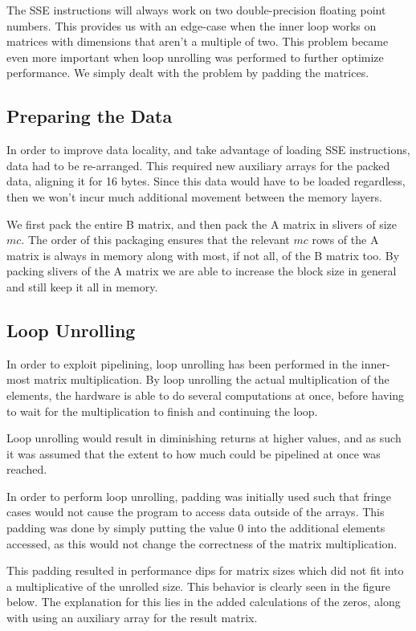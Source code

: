 \documentclass[a4paper.11pt,oneside]{book}
\begin{document}
The SSE instructions will always work on two double-precision floating point
numbers. This provides us with an edge-case when the inner loop works on
matrices with dimensions that aren't a multiple of two. This problem became even
more important when loop unrolling was performed to further optimize
performance. We simply dealt with the problem by padding the matrices.

\subsection{Preparing the Data}

In order to improve data locality, and take advantage of loading SSE
instructions, data had to be re-arranged. This required new auxiliary arrays for
the packed data, aligning it for 16 bytes. Since this data would have to be
loaded regardless, then we won't incur much additional movement between the 
memory layers. 

We first pack the entire B matrix, and then pack the A matrix in slivers of size
$mc$. The order of this packaging ensures that the relevant $mc$ rows of the A
matrix is always in memory along with most, if not all, of the B matrix too. By
packing slivers of the A matrix we are able to increase the block size in
general and still keep it all in memory.

\subsection{Loop Unrolling}

In order to exploit pipelining, loop unrolling has been performed in the inner-
most matrix multiplication. By loop unrolling the actual multiplication of the
elements, the hardware is able to do several computations at once, before having
to wait for the multiplication to finish and continuing the loop.

Loop unrolling would result in diminishing returns at higher values, and as
such it was assumed that the extent to how much could be pipelined at once was
reached.


In order to perform loop unrolling, padding was initially used such that fringe
cases would not cause the program to access data outside of the arrays. This
padding was done by simply putting the value 0 into the additional elements
accessed, as this would not change the correctness of the matrix multiplication.

This padding resulted in performance dips for matrix sizes which did not fit
into a multiplicative of the unrolled size. This behavior is clearly seen in
the figure below. The explanation for this lies in the added calculations of the
zeros, along with using an auxiliary array for the result matrix.
\end{document}
